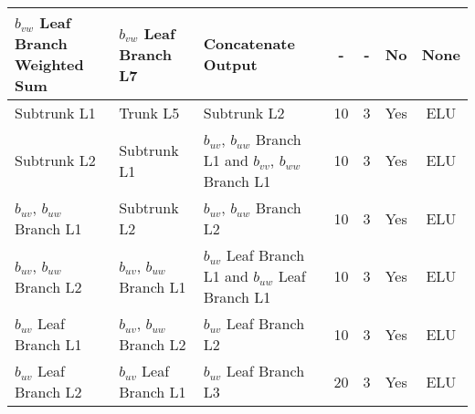 \documentclass[11pt]{article}
\numberwithin{equation}{section}
\theoremstyle{plain}
\theoremstyle{definition}
\begin{document}
\begin{sidewaystable}[]
{\begin{tabular}{lllcccc}
$b_{vw}$ Leaf Branch Weighted Sum                 & $b_{vw}$ Leaf Branch L7                                                & Concatenate Output                                              & -                                      & -                                            & No                                       & None                                     \\ \midrule
Subtrunk L1 & Trunk L5                                                       & Subtrunk L2                       & 10                                     & 3                                            & Yes                                      & ELU                                      \\
Subtrunk L2 & Subtrunk L1                           & $b_{uv}$, $b_{uw}$ Branch L1 and $b_{vv}$, $b_{ww}$ Branch L1     & 10                                     & 3                                            & Yes                                      & ELU                                      \\ \midrule
$b_{uv}$, $b_{uw}$ Branch L1               & Subtrunk L2                           & $b_{uv}$, $b_{uw}$ Branch L2                                     & 10                                     & 3                                            & Yes                                      & ELU                                      \\ 
$b_{uv}$, $b_{uw}$ Branch L2               & $b_{uv}$, $b_{uw}$ Branch L1                                         & $b_{uv}$ Leaf Branch L1 and $b_{uw}$ Leaf Branch L1                   & 10                                     & 3                                            & Yes                                      & ELU                                      \\ \midrule
$b_{uv}$ Leaf Branch L1                      & $b_{uv}$, $b_{uw}$ Branch L2                                         & $b_{uv}$ Leaf Branch L2                                            & 10                                     & 3                                            & Yes                                      & ELU                                      \\ 
$b_{uv}$ Leaf Branch L2                      & $b_{uv}$ Leaf Branch L1                                                & $b_{uv}$ Leaf Branch L3                                            & 20                                     & 3                                            & Yes                                      & ELU                                      \\ 

\end{tabular}}
\end{sidewaystable}
\end{document}
